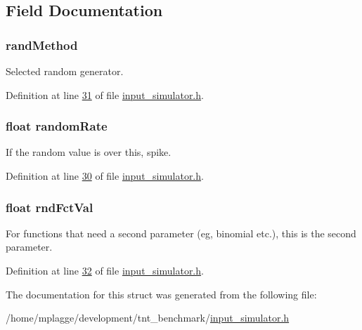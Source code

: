 \subsection{Field Documentation}
\hypertarget{structrandom_spikes_a18766f12fc4212349fb61b221f83b779}{}
\subsubsection[{rand\+Method}]{ rand\+Method}\label{structrandom_spikes_a18766f12fc4212349fb61b221f83b779}


Selected random generator. 



Definition at line \hyperlink{input__simulator_8h_source_l00031}{31} of file \hyperlink{input__simulator_8h_source}{input\+\_\+simulator.\+h}.

\hypertarget{structrandom_spikes_a1333eb5695ae83d1ffccf24b08bc6288}{}
\subsubsection[{random\+Rate}]{\setlength{\rightskip}{0pt plus 5cm}float random\+Rate}\label{structrandom_spikes_a1333eb5695ae83d1ffccf24b08bc6288}


If the random value is over this, spike. 



Definition at line \hyperlink{input__simulator_8h_source_l00030}{30} of file \hyperlink{input__simulator_8h_source}{input\+\_\+simulator.\+h}.

\hypertarget{structrandom_spikes_a0eb8199754a403ccc8eac256f9193a02}{}
\subsubsection[{rnd\+Fct\+Val}]{\setlength{\rightskip}{0pt plus 5cm}float rnd\+Fct\+Val}\label{structrandom_spikes_a0eb8199754a403ccc8eac256f9193a02}


For functions that need a second parameter (eg, binomial etc.), this is the second parameter. 



Definition at line \hyperlink{input__simulator_8h_source_l00032}{32} of file \hyperlink{input__simulator_8h_source}{input\+\_\+simulator.\+h}.



The documentation for this struct was generated from the following file\+:\begin{DoxyCompactItemize}
\item 
/home/mplagge/development/tnt\+\_\+benchmark/\hyperlink{input__simulator_8h}{input\+\_\+simulator.\+h}\end{DoxyCompactItemize}
